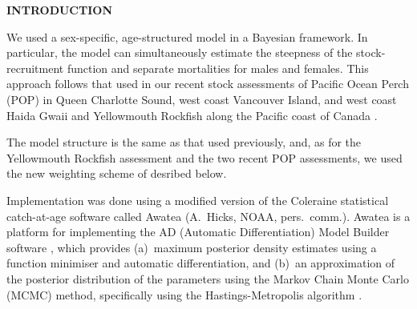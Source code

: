 \documentclass[11pt]{article}   %
\def\AppLet{E}                   %
\def\StartP{109}                 %
\newcommand{\popQCS}{Edwards-etal:2012pop}
\newcommand{\ymr}{Edwards-etal:2012ymr}
\newcommand{\popWCVI}{Edwards-etal:20133CD}
\newcommand{\popWCHG}{Edwards-etal:20135DE}
\begin{document}
   
\setcounter{page}{\StartP}

\begin{center}
\noindent {\bf \large APPENDIX~\AppLet.~~MODEL EQUATIONS}
\end{center}



{\bf INTRODUCTION}


We used a sex-specific, age-structured model in a Bayesian framework. In particular, the model can simultaneously estimate the steepness of the stock-recruitment function and separate mortalities for males and females. This approach follows that used in our recent stock assessments of Pacific Ocean Perch (POP) in Queen Charlotte Sound,  west coast Vancouver Island, and west coast Haida Gwaii \citep{\popQCS, \popWCVI, \popWCHG} and Yellowmouth Rockfish along the Pacific coast of Canada \citep{\ymr}. 

The model structure is the same as that used previously, and, as for the Yellowmouth Rockfish assessment and the two recent POP assessments, we used the new weighting scheme of \citet{fran11} desribed below.

Implementation was done using a modified version of the Coleraine statistical catch-at-age software \citep{hmpeps03} called Awatea (A.~Hicks, NOAA, pers.~comm.). Awatea is a platform for implementing the AD (Automatic Differentiation) Model Builder software \citep{ADMB2009}, which provides (a)~maximum posterior density estimates using a function minimiser and automatic differentiation, and (b)~an approximation of the posterior distribution of the parameters using the Markov Chain Monte Carlo (MCMC) method, specifically using the Hastings-Metropolis algorithm \citep{gelman2004bayesian}. 
\end{document}
